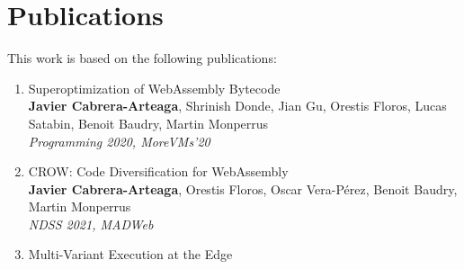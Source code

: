 \section{Publications}

This work is based on the following publications:

\begin{enumerate}[label=\subscript{P}{{\arabic*}}]
    \item Superoptimization of WebAssembly Bytecode \cite{WasmSuperoptimizer}\\
    {\small\textbf{Javier Cabrera-Arteaga}, Shrinish Donde, Jian Gu, Orestis Floros, Lucas Satabin, Benoit Baudry, Martin Monperrus}\\
        \emph{Programming 2020, MoreVMs'20}\\
    \item CROW: Code Diversification for WebAssembly \cite{CROW}\\
    {\small\textbf{Javier Cabrera-Arteaga}, Orestis Floros, Oscar Vera-Pérez, Benoit Baudry, Martin Monperrus}\\
    \emph{NDSS 2021, MADWeb}\\
    \item Multi-Variant Execution at the Edge \cite{MEWE}\\

\end{enumerate}
